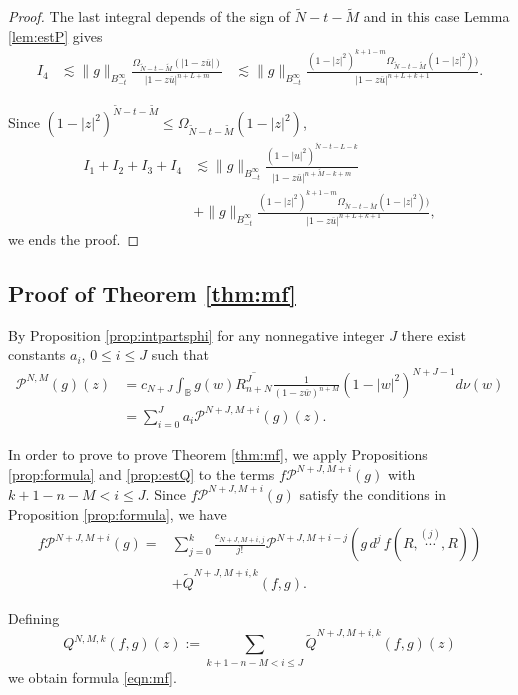 \documentclass[12pt,twoside,leqno,final]{amsart}
\theoremstyle{plain}
\begin{document}
\begin{proof}
The last integral depends of the sign of $\tilde N-t-\tilde M$ and in this case Lemma \ref{lem:estP} gives
\begin{align*}
I_4&\lesssim \|g\|_{B^\infty_{-t}}\frac{\Omega_{\tilde N-t-\tilde M}
(|1-z\overline u|)}{|1-z\overline u|^{n+L+m}}
&\lesssim \|g\|_{B^\infty_{-t}}\frac{(1-|z|^2)^{k+1-m}
\Omega_{\tilde N-t-\tilde M}(1-|z|^2))}{|1-z\overline u|^{n+L+k+1}}.
\end{align*}

 Since $(1-|z|^2)^{\tilde N-t-\tilde M}\le \Omega_{\tilde N-t-\tilde M}(1-|z|^2)$, 
 \begin{align*}
 I_1+I_2+I_3+I_4&\lesssim \|g\|_{B^\infty_{-t}}
 \frac{(1-|u|^2)^{\tilde N-t-L-k}}{|1-z\overline u|^{n+\tilde M-k+m}} \\
 &+\|g\|_{B^\infty_{-t}}\frac{(1-|z|^2)^{k+1-m}
 \Omega_{\tilde N-t-\tilde M}(1-|z|^2))}{|1-z\overline u|^{n+L+k+1}},
\end{align*}
 we ends the proof.
\end{proof}

\subsection{Proof of Theorem \ref{thm:mf}}
By Proposition \ref{prop:intpartsphi} for any nonnegative integer $J$ there exist constants $a_i$, $0\le i\le J$ such that 
\begin{align*}
{{\mathcal P}}^{N,M}(g)(z)&=c_{N+J}\int_{{\mathbb B}} g(w)\overline{R^J_{n+N}}\frac{1}{(1-z\overline w)^{n+M}} (1-|w|^2)^{N+J-1}d\nu(w)\\
&=\sum_{i=0}^{J}a_i {{\mathcal P}}^{N+J,M+i}(g)(z).
\end{align*}

In order to prove to prove Theorem \ref{thm:mf}, we apply Propositions \ref{prop:formula} and 
\ref{prop:estQ} to the terms $f{{\mathcal P}}^{N+J,M+i}(g)$ with  $k+1-n-M<i\le J$. 
 Since  $f{{\mathcal P}}^{N+J,M+i}(g)$ satisfy  the conditions in Proposition \ref{prop:formula}, we have 
\begin{align*}
f {{\mathcal P}}^{N+J,M+i} (g)=&\sum_{j=0}^k \frac{c_{N+J,M+i,j}}{j!} 
{{\mathcal P}}^{N+J,M+i-j}\left(g\,d^j\,f(R,\overset{(j)}{\cdots},R)\right)\\
&+\tilde Q^{N+J,M+i,k}(f,g).
\end{align*}

Defining 
$$
Q^{N,M,k}(f,g)(z):=\sum_{k+1-n-M<i\le J} \tilde Q^{N+J,M+i,k}(f,g)(z)
$$
we obtain formula \eqref{eqn:mf}.
\end{document}
